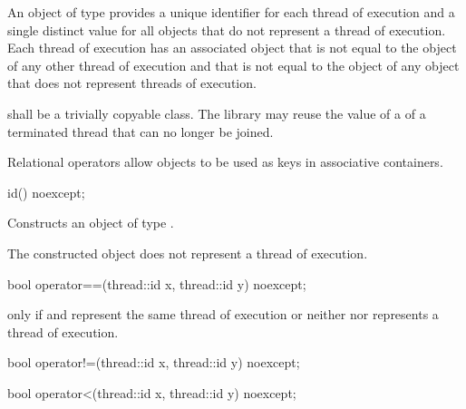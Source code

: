 \pnum An object of type  provides a unique identifier for
each thread of execution and a single distinct value for all 
objects that do not represent a thread of
execution. Each thread of execution has an
associated  object that is not equal to the
 object of any other thread of execution and that is not
equal to the  object of any  object that
does not represent threads of execution.

\pnum
{} shall be a trivially copyable class.
The library may reuse the value of a  of a terminated thread that can no longer be joined.

\pnum
\begin{note} Relational operators allow  objects to be used as
keys in associative containers. \end{note}

%
\begin{itemdecl}
id() noexcept;
\end{itemdecl}

\begin{itemdescr}
\pnum\effects Constructs an object of type .

\pnum\postconditions The constructed object does not represent a thread of execution.
\end{itemdescr}

%
\begin{itemdecl}
bool operator==(thread::id x, thread::id y) noexcept;
\end{itemdecl}

\begin{itemdescr}
\pnum\returns {} only if  and  represent the same
thread of execution or neither  nor  represents a thread of
execution.
\end{itemdescr}

%
\begin{itemdecl}
bool operator!=(thread::id x, thread::id y) noexcept;
\end{itemdecl}

\begin{itemdescr}
\pnum\returns {}
\end{itemdescr}

%
\begin{itemdecl}
bool operator<(thread::id x, thread::id y) noexcept;
\end{itemdecl}

